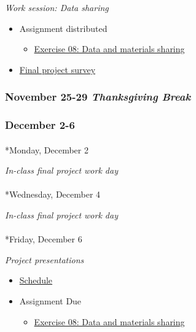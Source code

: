 \documentclass[
  letterpaper,
  DIV=11,
  numbers=noendperiod]{scrartcl}
\makeatletter
\let\oldparagraph\paragraph
\renewcommand{\paragraph}{
    \@ifstar
      \xxxParagraphStar
      \xxxParagraphNoStar
  }
\newcommand{\xxxParagraphStar}[1]{\oldparagraph*{#1}\mbox{}}
\newcommand{\xxxParagraphNoStar}[1]{\oldparagraph{#1}\mbox{}}
\providecommand{\tightlist}{%
  \setlength{\itemsep}{0pt}\setlength{\parskip}{0pt}}\usepackage{longtable,booktabs,array}
\makeatother
\begin{document}
\emph{Work session: Data sharing}

\begin{itemize}
\tightlist
\item
  {Assignment distributed}

  \begin{itemize}
  \tightlist
  \item
    \href{exercises/ex08-sharing.qmd}{Exercise 08: Data and materials
    sharing}
  \end{itemize}
\item
  {\href{https://forms.gle/vtdJ82Y7AjgU15VA9}{Final project survey}}
\end{itemize}

\subsubsection{\texorpdfstring{November 25-29 \emph{Thanksgiving
Break}}{November 25-29 Thanksgiving Break}}\label{november-25-29-thanksgiving-break}

\subsubsection*{December 2-6}\label{week-14}

\paragraph*{Monday, December 2}\label{monday-december-2}

\emph{In-class final project work day}

\paragraph*{Wednesday, December 4}\label{wednesday-december-4}

\emph{In-class final project work day}

\paragraph*{Friday, December 6}\label{friday-december-6}

\emph{Project presentations}

\begin{itemize}
\tightlist
\item
  \href{}{Schedule}
\item
  {Assignment Due}

  \begin{itemize}
  \tightlist
  \item
    \href{exercises/ex08-sharing.qmd}{Exercise 08: Data and materials
    sharing}
  \end{itemize}
\end{itemize}
\end{document}
